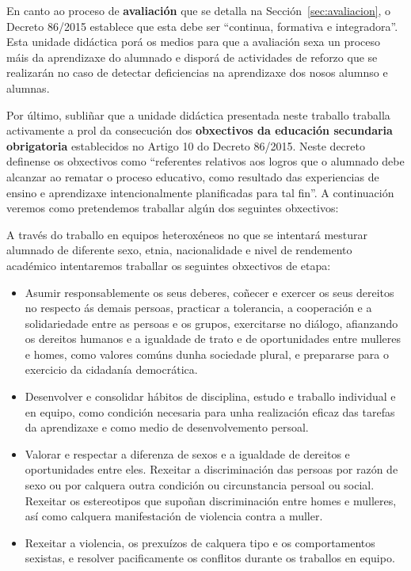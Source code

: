 En canto ao proceso de \textbf{avaliación} que se detalla na Sección~\ref{sec:avaliacion}, o Decreto 86/2015 establece que esta debe ser ``continua, formativa e integradora''.  Esta unidade didáctica porá os medios para que a avaliación sexa un proceso máis da aprendizaxe do alumnado e disporá de actividades de reforzo que se realizarán no caso de detectar deficiencias na aprendizaxe dos nosos alumnso e alumnas.

Por último, subliñar que a unidade didáctica presentada neste traballo traballa activamente a prol da consecución dos \textbf{obxectivos da educación secundaria obrigatoria} establecidos no Artigo 10 do Decreto 86/2015. Neste decreto definense os obxectivos como ``referentes relativos aos logros que o alumnado debe alcanzar ao rematar o proceso educativo, como resultado das experiencias de ensino e aprendizaxe intencionalmente planificadas para tal fin''. A continuación veremos como pretendemos traballar algún dos seguintes obxectivos:

A través do traballo en equipos heteroxéneos no que se intentará mesturar alumnado de diferente sexo, etnia, nacionalidade e nivel de rendemento académico intentaremos traballar os seguintes obxectivos de etapa:

\begin{itemize}
    \item Asumir responsablemente os seus deberes, coñecer e exercer os seus dereitos no respecto ás demais persoas, practicar a tolerancia, a cooperación e a solidariedade entre as persoas e os grupos, exercitarse no diálogo, afianzando os dereitos humanos e a igualdade de trato e de oportunidades entre mulleres e homes, como valores comúns dunha sociedade plural, e prepararse para o exercicio da cidadanía democrática.

    \item Desenvolver e consolidar hábitos de disciplina, estudo e traballo individual e en equipo, como condición necesaria para unha realización eficaz das tarefas da aprendizaxe e como medio de desenvolvemento persoal.

    \item Valorar e respectar a diferenza de sexos e a igualdade de dereitos e oportunidades entre eles. Rexeitar a discriminación das persoas por razón de sexo ou por calquera outra condición ou circunstancia persoal ou social. Rexeitar os estereotipos que supoñan discriminación entre homes e mulleres, así como calquera manifestación de violencia contra a muller.

    \item Rexeitar a violencia, os prexuízos de calquera tipo e os comportamentos sexistas, e resolver pacificamente os conflitos durante os traballos en equipo.
\end{itemize}

